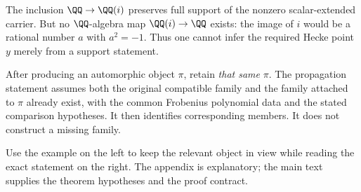 The inclusion $\QQ\to\QQ(i)$ preserves full support of the nonzero scalar-extended carrier. But no $\QQ$-algebra map $\QQ(i)\to\QQ$ exists: the image of $i$ would be a rational number $a$ with $a^2=-1$. Thus one cannot infer the required Hecke point $y$ merely from a support statement.

After producing an automorphic object $\pi$, retain \emph{that same} $\pi$. The propagation statement assumes both the original compatible family and the family attached to $\pi$ already exist, with the common Frobenius polynomial data and the stated comparison hypotheses. It then identifies corresponding members. It does not construct a missing family.


Use the example on the left to keep the relevant object in view while reading the exact statement on the right. The appendix is explanatory; the main text supplies the theorem hypotheses and the proof contract.

